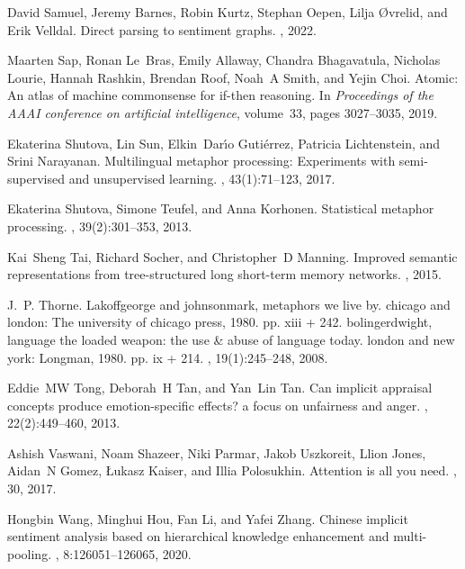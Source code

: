 \documentclass[11pt]{article}
\begin{document}
\begin{thebibliography}{10}
David Samuel, Jeremy Barnes, Robin Kurtz, Stephan Oepen, Lilja {\O}vrelid, and
  Erik Velldal.
\newblock Direct parsing to sentiment graphs.
, 2022.

Maarten Sap, Ronan Le~Bras, Emily Allaway, Chandra Bhagavatula, Nicholas
  Lourie, Hannah Rashkin, Brendan Roof, Noah~A Smith, and Yejin Choi.
\newblock Atomic: An atlas of machine commonsense for if-then reasoning.
\newblock In {\em Proceedings of the AAAI conference on artificial
  intelligence}, volume~33, pages 3027--3035, 2019.

Ekaterina Shutova, Lin Sun, Elkin~Dar{\'\i}o Guti{\'e}rrez, Patricia
  Lichtenstein, and Srini Narayanan.
\newblock Multilingual metaphor processing: Experiments with semi-supervised
  and unsupervised learning.
, 43(1):71--123, 2017.

Ekaterina Shutova, Simone Teufel, and Anna Korhonen.
\newblock Statistical metaphor processing.
, 39(2):301--353, 2013.

Kai~Sheng Tai, Richard Socher, and Christopher~D Manning.
\newblock Improved semantic representations from tree-structured long
  short-term memory networks.
, 2015.

J.~P. Thorne.
\newblock Lakoffgeorge and johnsonmark, metaphors we live by. chicago and
  london: The university of chicago press, 1980. pp. xiii + 242.
  bolingerdwight, language the loaded weapon: the use \& abuse of language
  today. london and new york: Longman, 1980. pp. ix + 214.
, 19(1):245--248, 2008.

Eddie~MW Tong, Deborah~H Tan, and Yan~Lin Tan.
\newblock Can implicit appraisal concepts produce emotion-specific effects? a
  focus on unfairness and anger.
, 22(2):449--460, 2013.

Ashish Vaswani, Noam Shazeer, Niki Parmar, Jakob Uszkoreit, Llion Jones,
  Aidan~N Gomez, {\L}ukasz Kaiser, and Illia Polosukhin.
\newblock Attention is all you need.
, 30, 2017.

Hongbin Wang, Minghui Hou, Fan Li, and Yafei Zhang.
\newblock Chinese implicit sentiment analysis based on hierarchical knowledge
  enhancement and multi-pooling.
, 8:126051--126065, 2020.


\end{thebibliography}
\end{document}
